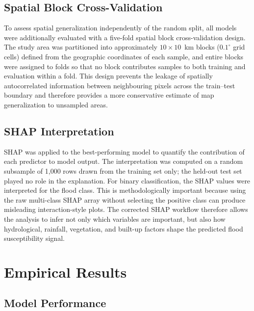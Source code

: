 \documentclass[11pt,twoside]{article}
\begin{document}
\subsection{Spatial Block Cross-Validation}\label{spatial-cv-protocol}

To assess spatial generalization independently of the random split, all models
were additionally evaluated with a five-fold spatial block cross-validation
design. The study area was partitioned into approximately $10 \times 10$~km
blocks ($0.1^{\circ}$ grid cells) defined from the geographic coordinates of
each sample, and entire blocks were assigned to folds so that no block
contributes samples to both training and evaluation within a fold. This design
prevents the leakage of spatially autocorrelated information between
neighbouring pixels across the train--test boundary and therefore provides a
more conservative estimate of map generalization to unsampled areas.
 
\subsection{SHAP Interpretation}\label{shap-interpretation}

SHAP was applied to the best-performing model to quantify the contribution of
each predictor to model output. The interpretation was computed on a random
subsample of 1,000 rows drawn from the training set only; the held-out test set
played no role in the explanation. For binary classification, the SHAP values
were
interpreted for the flood class. This is methodologically important because
using the raw multi-class SHAP array without selecting the positive class can
produce misleading interaction-style plots. The corrected SHAP workflow therefore
allows the analysis to infer not only which variables are important, but also
how hydrological, rainfall, vegetation, and built-up factors shape the predicted
flood susceptibility signal.
 
\section{Empirical Results}\label{results}
 
\subsection{Model Performance}\label{model-performance}
\end{document}
